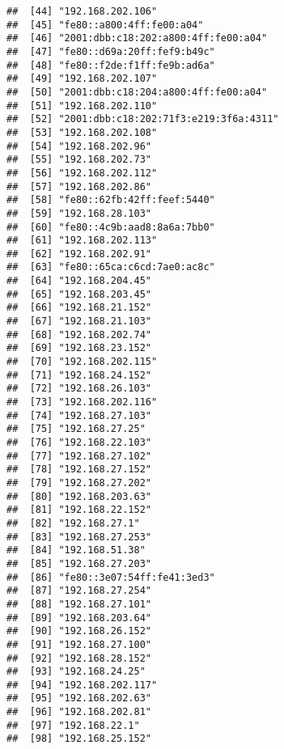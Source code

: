 \documentclass[
]{article}
\begin{document}
\begin{verbatim}
##  [44] "192.168.202.106"                     
##  [45] "fe80::a800:4ff:fe00:a04"             
##  [46] "2001:dbb:c18:202:a800:4ff:fe00:a04"  
##  [47] "fe80::d69a:20ff:fef9:b49c"           
##  [48] "fe80::f2de:f1ff:fe9b:ad6a"           
##  [49] "192.168.202.107"                     
##  [50] "2001:dbb:c18:204:a800:4ff:fe00:a04"  
##  [51] "192.168.202.110"                     
##  [52] "2001:dbb:c18:202:71f3:e219:3f6a:4311"
##  [53] "192.168.202.108"                     
##  [54] "192.168.202.96"                      
##  [55] "192.168.202.73"                      
##  [56] "192.168.202.112"                     
##  [57] "192.168.202.86"                      
##  [58] "fe80::62fb:42ff:feef:5440"           
##  [59] "192.168.28.103"                      
##  [60] "fe80::4c9b:aad8:8a6a:7bb0"           
##  [61] "192.168.202.113"                     
##  [62] "192.168.202.91"                      
##  [63] "fe80::65ca:c6cd:7ae0:ac8c"           
##  [64] "192.168.204.45"                      
##  [65] "192.168.203.45"                      
##  [66] "192.168.21.152"                      
##  [67] "192.168.21.103"                      
##  [68] "192.168.202.74"                      
##  [69] "192.168.23.152"                      
##  [70] "192.168.202.115"                     
##  [71] "192.168.24.152"                      
##  [72] "192.168.26.103"                      
##  [73] "192.168.202.116"                     
##  [74] "192.168.27.103"                      
##  [75] "192.168.27.25"                       
##  [76] "192.168.22.103"                      
##  [77] "192.168.27.102"                      
##  [78] "192.168.27.152"                      
##  [79] "192.168.27.202"                      
##  [80] "192.168.203.63"                      
##  [81] "192.168.22.152"                      
##  [82] "192.168.27.1"                        
##  [83] "192.168.27.253"                      
##  [84] "192.168.51.38"                       
##  [85] "192.168.27.203"                      
##  [86] "fe80::3e07:54ff:fe41:3ed3"           
##  [87] "192.168.27.254"                      
##  [88] "192.168.27.101"                      
##  [89] "192.168.203.64"                      
##  [90] "192.168.26.152"                      
##  [91] "192.168.27.100"                      
##  [92] "192.168.28.152"                      
##  [93] "192.168.24.25"                       
##  [94] "192.168.202.117"                     
##  [95] "192.168.202.63"                      
##  [96] "192.168.202.81"                      
##  [97] "192.168.22.1"                        
##  [98] "192.168.25.152"                      

\end{verbatim}
\end{document}
